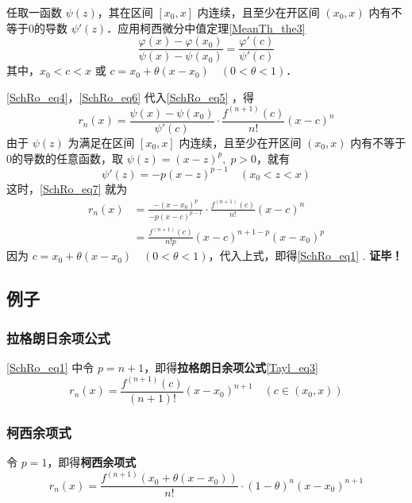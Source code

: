 任取一函数 $\psi(z)$，其在区间 $[x_0,x]$ 内连续，且至少在开区间 $(x_0,x)$ 内有不等于0的导数 $\psi'(z)$．应用柯西微分中值定理\autoref{MeanTh_the3}~
\begin{equation}\label{SchRo_eq5}
\frac{\varphi(x)-\varphi(x_0)}{\psi(x)-\psi(x_0)}=\frac{\varphi'(c)}{\psi'(c)}
\end{equation}
其中，$x_0<c<x$ 或 $c=x_0+\theta(x-x_0)\quad(0<\theta<1)$．

\autoref{SchRo_eq4}，\autoref{SchRo_eq6}  代入\autoref{SchRo_eq5} ，得
\begin{equation}\label{SchRo_eq7}
r_n(x)=\frac{\psi(x)-\psi(x_0)}{\psi'(c)}\cdot\frac{f^{(n+1)}(c)}{n!}(x-c)^n
\end{equation}
由于 $\psi(z)$ 为满足在区间 $[x_0,x]$ 内连续，且至少在开区间 $(x_0,x)$ 内有不等于0的导数的任意函数，取 $\psi(z)=(x-z)^p,\;p>0$，就有
\begin{equation}
\psi'(z)=-p(x-z)^{p-1}\quad (x_0<z<x)
\end{equation}
这时，\autoref{SchRo_eq7} 就为
\begin{equation}
\begin{aligned}
r_n(x)&=\frac{-(x-x_0)^p}{-p(x-c)^{p-1}}\cdot\frac{f^{(n+1)}(c)}{n!}(x-c)^n\\
&=\frac{f^{(n+1)}(c)}{n!p}(x-c)^{n+1-p}(x-x_0)^p
\end{aligned}
\end{equation}
因为 $c=x_0+\theta(x-x_0)\quad(0<\theta<1)$，代入上式，即得\autoref{SchRo_eq1} .
\textbf{证毕！}

\subsection{例子}
\subsubsection{拉格朗日余项公式}
\autoref{SchRo_eq1} 中令 $p=n+1$，即得\textbf{拉格朗日余项公式}\autoref{Tayl_eq3}~
\begin{equation}
r_n(x)=\frac{f^{(n+1)}(c)}{(n+1)!}(x-x_0)^{n+1}\quad (c\in(x_0,x))
\end{equation}
\subsubsection{柯西余项式}
令 $p=1$，即得\textbf{柯西余项式}
\begin{equation}
r_n(x)=\frac{f^{(n+1)}(x_0+\theta(x-x_0))}{n!}\cdot(1-\theta)^{n}(x-x_0)^{n+1}
\end{equation}
